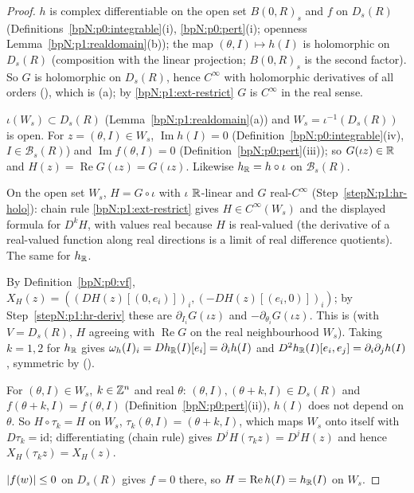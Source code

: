 \begin{proof}
\label{stepN:p1:hr-holo} $h$ is complex differentiable on the open set $B(0,R)_s$ and $f$ on $D_s(R)$ (Definitions~\ref{bpN:p0:integrable}(i), \ref{bpN:p0:pert}(i); openness Lemma~\ref{bpN:p1:realdomain}(b)); the map $(\theta,I)\mapsto h(I)$ is holomorphic on $D_s(R)$ (composition with the linear projection; $B(0,R)_s$ is the second factor). So $G$ is holomorphic on $D_s(R)$, hence $C^\infty$ with holomorphic derivatives of all orders (), which is (a); by \ref{bpN:p1:ext-restrict} $G$ is $C^\infty$ in the real sense.

\label{stepN:p1:hr-real} $\iota(W_s)\subset D_s(R)$ (Lemma~\ref{bpN:p1:realdomain}(a)) and $W_s=\iota^{-1}(D_s(R))$ is open. For $z=(\theta,I)\in W_s$, $\operatorname{Im}h(I)=0$ (Definition~\ref{bpN:p0:integrable}(iv), $I\in\mathcal B_s(R)$) and $\operatorname{Im}f(\theta,I)=0$ (Definition~\ref{bpN:p0:pert}(iii)); so $G(\iota z)\in\mathbb{R}$ and $H(z)=\operatorname{Re}G(\iota z)=G(\iota z)$. Likewise $h_{\mathbb{R}}=h\circ\iota$ on $\mathcal B_s(R)$.

\label{stepN:p1:hr-deriv} On the open set $W_s$, $H=G\circ\iota$ with $\iota$ $\mathbb{R}$-linear and $G$ real-$C^\infty$ (Step~\ref{stepN:p1:hr-holo}): chain rule \ref{bpN:p1:ext-restrict} gives $H\in C^\infty(W_s)$ and the displayed formula for $D^kH$, with values real because $H$ is real-valued (the derivative of a real-valued function along real directions is a limit of real difference quotients). The same for $h_{\mathbb{R}}$.

\label{stepN:p1:hr-field} By Definition~\ref{bpN:p0:vf}, $X_H(z)=((DH(z)[(0,e_i)])_i,(-DH(z)[(e_i,0)])_i)$; by Step~\ref{stepN:p1:hr-deriv} these are $\partial_{I_i}G(\iota z)$ and $-\partial_{\theta_i}G(\iota z)$. This is  (with $V=D_s(R)$, $H$ agreeing with $\operatorname{Re}G$ on the real neighbourhood $W_s$). Taking $k=1,2$ for $h_{\mathbb{R}}$ gives $\omega_h(I)_i=Dh_{\mathbb{R}}(I)[e_i]=\partial_ih(I)$ and $D^2h_{\mathbb{R}}(I)[e_i,e_j]=\partial_i\partial_jh(I)$, symmetric by  ().

\label{stepN:p1:hr-per} For $(\theta,I)\in W_s$, $k\in\mathbb{Z}^n$ and real $\theta$: $(\theta,I),(\theta+k,I)\in D_s(R)$ and $f(\theta+k,I)=f(\theta,I)$ (Definition~\ref{bpN:p0:pert}(ii)), $h(I)$ does not depend on $\theta$. So $H\circ\tau_k=H$ on $W_s$, $\tau_k(\theta,I)=(\theta+k,I)$, which maps $W_s$ onto itself with $D\tau_k=\mathrm{id}$; differentiating (chain rule) gives $D^jH(\tau_kz)=D^jH(z)$ and hence $X_H(\tau_kz)=X_H(z)$.

\label{stepN:p1:hr-zero} $\lvert f(w)\rvert\le0$ on $D_s(R)$ gives $f=0$ there, so $H=\operatorname{Re}h(I)=h_{\mathbb{R}}(I)$ on $W_s$.
\end{proof}

